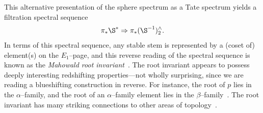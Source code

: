 This alternative presentation of the sphere spectrum as a Tate spectrum yields a filtration spectral sequence \[\pi_* \S^* \Rightarrow \pi_* (\S^{-1})^\wedge_2.\]
In terms of this spectral sequence, any stable stem is represented by a (coset of) element(s) on the \(E_1\)--page, and this reverse reading of the spectral sequence is known as the \textit{Mahowald root invariant}~\cite{MahowaldShick}.
The root invariant appears to possess deeply interesting redshifting properties---not wholly surprising, since we are reading a blueshifting construction in reverse.
For instance, the root of \(p\) lies in the \(\alpha\)--family, and the root of an \(\alpha\)--family element lies in the \(\beta\)--family~\cite{BehrensRootInv}.
The root invariant has many striking connections to other areas of topology~\cite{MahowaldRavenel}.


